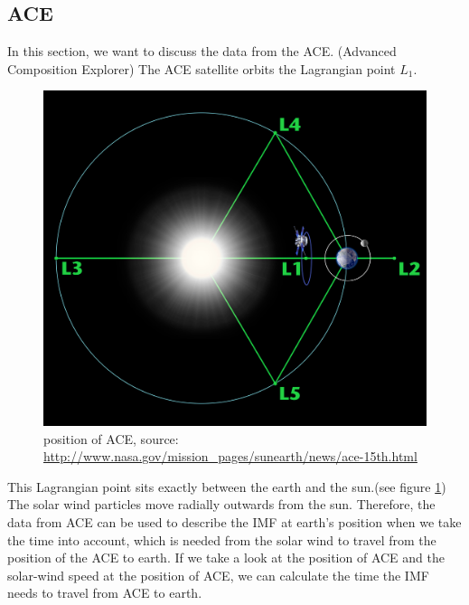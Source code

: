 \documentclass[10pt,a4paper]{article}
\begin{document}
\subsection{ACE}
In this section, we want to discuss the data from the ACE. (Advanced Composition Explorer)
The ACE satellite orbits the Lagrangian point $L_1$.
\begin{figure}[h]
\centering
\includegraphics[scale=0.06]{ACEposition.jpg}
\caption{position of ACE, source: \url{http://www.nasa.gov/mission_pages/sunearth/news/ace-15th.html} }
\label{position of ACE}
\end{figure}

This Lagrangian point sits exactly between the earth and the sun.(see figure \ref{position of ACE}) The solar wind particles move radially outwards from the sun. Therefore, the data from ACE can be used to describe the IMF at earth's position when we take the time into account, which is needed from the solar wind to travel from the position of the ACE to earth. 
If we take a look at the position of ACE and the solar-wind speed at the position of ACE, we can calculate the time the IMF needs to travel from ACE to earth. 
\end{document}
